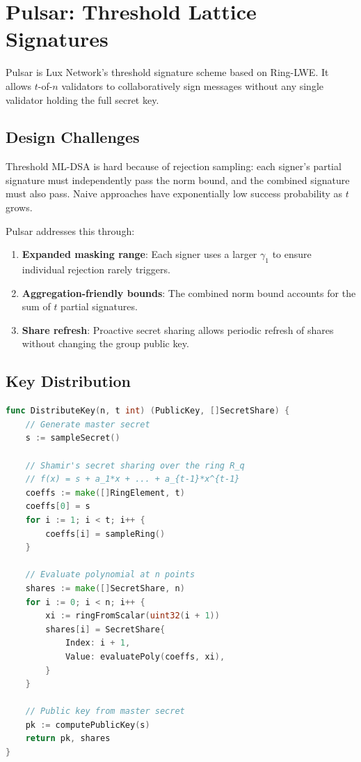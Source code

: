 \section{Pulsar: Threshold Lattice Signatures}


Pulsar is Lux Network's threshold signature scheme based on Ring-LWE. It allows
$t$-of-$n$ validators to collaboratively sign messages without any single validator
holding the full secret key.

\subsection{Design Challenges}

Threshold ML-DSA is hard because of rejection sampling: each signer's partial
signature must independently pass the norm bound, and the combined signature must also
pass. Naive approaches have exponentially low success probability as $t$ grows.

Pulsar addresses this through:
\begin{enumerate}[nosep]
  \item \textbf{Expanded masking range}: Each signer uses a larger $\gamma_1$ to ensure
    individual rejection rarely triggers.
  \item \textbf{Aggregation-friendly bounds}: The combined norm bound accounts for the sum
    of $t$ partial signatures.
  \item \textbf{Share refresh}: Proactive secret sharing allows periodic refresh of shares
    without changing the group public key.
\end{enumerate}

\subsection{Key Distribution}

\begin{lstlisting}[language=Go,caption={Pulsar key generation via Shamir's secret sharing over $R_q$}]
func DistributeKey(n, t int) (PublicKey, []SecretShare) {
    // Generate master secret
    s := sampleSecret()

    // Shamir's secret sharing over the ring R_q
    // f(x) = s + a_1*x + ... + a_{t-1}*x^{t-1}
    coeffs := make([]RingElement, t)
    coeffs[0] = s
    for i := 1; i < t; i++ {
        coeffs[i] = sampleRing()
    }

    // Evaluate polynomial at n points
    shares := make([]SecretShare, n)
    for i := 0; i < n; i++ {
        xi := ringFromScalar(uint32(i + 1))
        shares[i] = SecretShare{
            Index: i + 1,
            Value: evaluatePoly(coeffs, xi),
        }
    }

    // Public key from master secret
    pk := computePublicKey(s)
    return pk, shares
}
\end{lstlisting}

